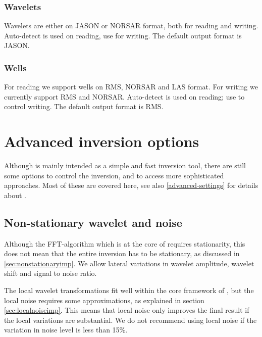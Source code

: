 \subsubsection{Wavelets}
Wavelets are either on JASON or NORSAR format,
  both for reading and writing. Auto-detect is used on reading, use 
  for writing. The default output format is JASON.

\subsubsection{Wells}
For reading we support wells on RMS, NORSAR and LAS format. For writing we currently support RMS and NORSAR. Auto-detect is used on reading; use  to control writing. The default output format is RMS.

\section{Advanced inversion options}
\label{sec:advinvusr}
Although \crava is mainly intended as a simple and fast inversion
tool, there are still some options to control the inversion, and to
access more sophisticated approaches. Most of these are covered here,
see 
also \autoref{advanced-settings} for details about
. 
\subsection{Non-stationary wavelet and noise}
Although the FFT-algorithm which is at the core of \crava requires
stationarity, this does not mean that the entire inversion has to be
stationary, as discussed in \autoref{sec:nonstationaryimp}. We allow
lateral variations in wavelet amplitude, wavelet shift and signal to
noise ratio.

The local wavelet transformations fit well within the core framework
of \crava, but the local noise requires some approximations, as
explained in section \autoref{sec:localnoiseimp}. This means that
local noise only improves the final result if the local variations are
substantial. We do not recommend using local noise if the variation in
noise level is less than 15\%.

